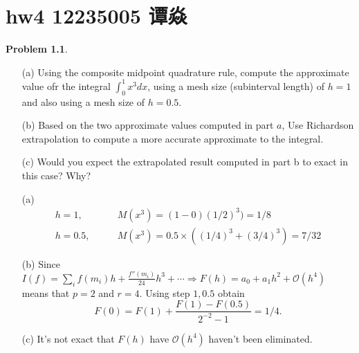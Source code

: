\documentclass[a4paper]{book}
\makeatletter
\newenvironment{sol}[1][\solname]{\par
  \pushQED{\qed}
  \normalfont \topsep6\p@\@plus6\p@\relax
  \trivlist
  \item[\hskip\labelsep
        \itshape
    #1\@addpunct{.}]\ignorespaces
}{\popQED\endtrivlist\@endpefalse}
\providecommand{\solname}{Solution}
\numberwithin{equation}{chapter}
\theoremstyle{definition}
\newtheorem{pro}{Problem}
\makeatother
\begin{document}

\pagestyle{fancy}


\setcounter{chapter}{3}



\chapter{hw4 12235005 谭焱}
\begin{pro}
    \begin{itemize}
        \item [(a)] Using the composite midpoint quadrature rule, 
        compute the approximate value ofr the integral $\int_0^1 x^3dx$,
        using a mesh size (subinterval length) of $h = 1$ and also
        using a mesh size of $h = 0.5$.

        \item [(b)] Based on the two approximate values computed in part $a$,
        Use Richardson extrapolation to compute a more accurate 
        approximate to the integral.

        \item [(c)] Would you expect the extrapolated result 
        computed in part b to exact in this case? Why?
    \end{itemize}
\end{pro}
\begin{sol}
    \begin{itemize}
        \item [(a)] \begin{align*}
            h = 1, \qquad &M(x^3) = (1 - 0)(1/2)^3) = 1/8 \\
            h = 0.5, \qquad &M(x^3) = 0.5 \times ((1/4)^3 + (3/4)^3) = 7/32
        \end{align*}

        \item [(b)] Since $I(f) = \sum_i f(m_i)h + 
        \frac{f''(m_i)}{24}h^3 + \cdots \Rightarrow 
        F(h) = a_0 + a_1h^2 + \mathcal{O}(h^4) $ means that 
        $p = 2$ and $r = 4$. Using step $1, 0.5$ obtain 
        \[F(0) = F(1) + \frac{F(1) - F(0.5)}{2^{-2} - 1} = 1/4.\]

        \item [(c)] It's not exact that $F(h)$ have $\mathcal{O}(h^4)$
        haven't been eliminated.
    \end{itemize}
\end{sol}
\end{document}
